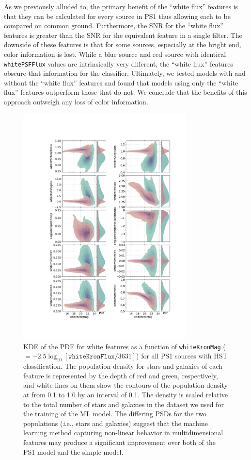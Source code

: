 \documentclass[twocolumn]{aastex62}
\begin{document}
As we previously alluded to, the primary benefit of the ``white flux'' features is that they can be calculated for every source in PS1 thus allowing each to be compared on common ground. Furthermore, the SNR for the ``white flux'' features is greater than the SNR for the equivalent feature in a single filter. The downside of these features is that for some sources, especially at the bright end, color information is lost. While a blue source and red source with identical \texttt{whitePSFFlux} values are intrinsically very different, the ``white flux'' features obscure that information for the classifier. Ultimately, we tested models with and without the ``white flux'' features and found that models using only the ``white flux'' features outperform those that do not. We conclude that the benefits of this approach outweigh any loss of color information. 

\begin{figure}[t]
 \centering
  \includegraphics[width=3.5in, bb = 139 113 862 1163]{./Figures/whiteFeatures.pdf}
  \caption{
  KDE of the PDF for white features as a function of \texttt{whiteKronMag}
  ($=-2.5\log_{10}[\mathtt{whiteKronFlux}/3631]$) 
  for all PS1 sources with HST classification. 
  The population density for stars and galaxies of each feature is represented by the depth of red and green, respectively, 
  and white lines on them show the contours of the population density at from 0.1 to 1.0 by an interval of 0.1.
  The density is scaled relative to the total number of stars and galaxies in the dataset we used for the training of the ML model. 
  The differing PSDs for the two populations ({\textit i.e.,} stars and galaxies) suggest that 
  the machine learning method capturing non-linear behavior in multidimensional features 
  may produce a significant improvement over both of the PS1 model and the simple model. }
  \label{fig:features}
\end{figure}
\end{document}
